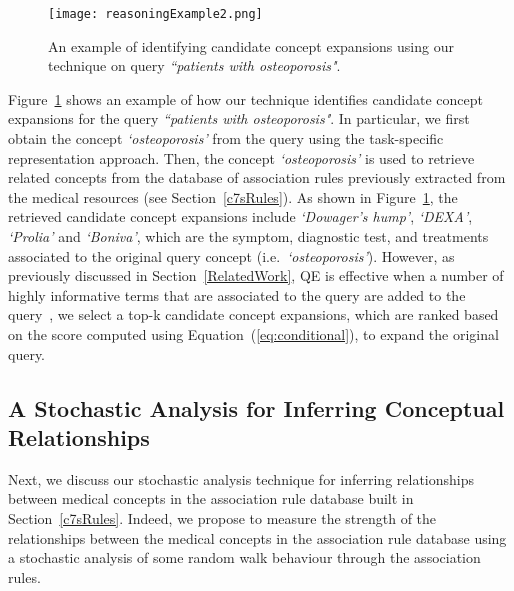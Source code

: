\documentclass[1p]{elsarticle}
\begin{document}
\begin{figure}[tb]
  \centering
\texttt{[image: reasoningExample2.png]}
\caption{An example of identifying candidate con\-cept expansions using our technique on query \emph{``patients with osteoporosis"}.}\label{fig:reasoning}
\end{figure}

Figure~\ref{fig:reasoning} shows an example of how our technique identifies candidate concept expansions for the query \emph{``patients with osteoporosis"}. In particular, we first obtain the concept \emph{`osteoporosis'} from the query using the task-specific representation approach. Then, the concept \emph{`osteoporosis'} is used to retrieve related concepts from the database of association rules previously extracted from the medical resources (see Section~\ref{c7sRules}). As shown in Figure~\ref{fig:reasoning}, the retrieved candidate concept expansions include \emph{`Dowager's hump'}, \emph{`DE\-XA'}, \emph{`Prolia'} and \emph{`Boniva'}, which are the symptom, diagnostic test, and treatments associated to the original query concept (i.e.\ \emph{`osteoporosis'}). 
However, as previously discussed in Section~\ref{RelatedWork}, QE is effective when a number of highly informative terms that are associated to the query are added to the query~\cite{amati2003thesis}, we select a top-k candidate concept expansions, which are ranked based on the score computed using Equation~(\ref{eq:conditional}), to expand the original query. 

\subsection{A Stochastic Analysis for Inferring Conceptual Relationships}\label{c7sRandomWalk}

Next, we discuss our stochastic analysis technique for inferring relationships between medical concepts in the association rule database built in Section~\ref{c7sRules}. Indeed, we propose to measure the strength of the relationships between the medical concepts in the association rule database using a stochastic analysis of some random walk behaviour through the association rules.
\end{document}
